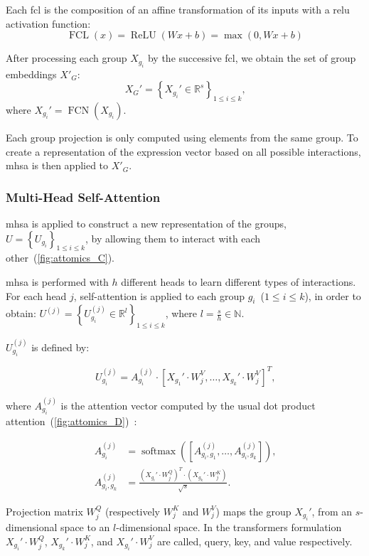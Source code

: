 \documentclass[../main.tex]{subfiles}
\begin{document}
Each \gls{fcl} is the composition of an affine transformation of its inputs with a \gls{relu} activation function:
\[ \operatorname{FCL}\left(x\right) = \operatorname{ReLU}\left(Wx+b \right) = \max\left(0, Wx+b\right) \]

After processing each group $X_{g_i}$ by the successive \gls{fcl}, we obtain the set of group embeddings $X'_G$:
\[ X_G' = \left\{ X_{g_i}' \in \mathbb{R}^{s}\right\}_{1 \leq i \leq k} \text{,} \]
where $X_{g_i}' = \operatorname{FCN}\left(X_{g_i}\right)$.

Each group projection is only computed using elements from the same group.
To create a representation of the expression vector based on all possible interactions, \gls{mhsa} is then applied to $X'_G$.

\subsubsection{Multi-Head Self-Attention}

\Gls{mhsa} is applied to construct a new representation of the groups, $U = \left\{ U_{g_i}\right\}_{1 \leq i \leq k}$, by allowing them to interact with each other~(\cref{fig:attomics_C}).

\Gls{mhsa} is performed with $h$ different heads to learn different types of interactions.
For each head $j$, self-attention is applied to each group $g_i$~($1 \leq i \leq k $), in order to obtain: $U^{(j)} = \left\{ U^{(j)}_{g_i} \in \mathbb{R}^{l} \right\}_{1 \leq i \leq k}$, where $l = \frac{s}{h} \in \mathbb{N}$.

$U^{(j)}_{g_i}$ is defined by:

\[ U^{(j)}_{g_i} = A^{(j)}_{g_i} \cdot \left[ X_{g_1}' \cdot W_j^V, \ldots ,  X_{g_k}' \cdot W_j^V\right]^T \text{,}\]

where $A^{(j)}_{g_i}$ is the attention vector computed by the usual dot product attention~(\cref{fig:attomics_D})~\cite{vaswaniAttentionAllYou2017}:

\begin{align*}
	A^{(j)}_{g_i}      & = \operatorname{softmax}\left(\left[A^{(j)}_{g_i,g_1}, \ldots,  A^{(j)}_{g_i,g_k}\right]\right) \text{,}  \\
	A^{(j)}_{g_i, g_k} & =  \frac{\left(X_{g_i}' \cdot W_j^Q\right)^T \cdot \left(X_{g_k}' \cdot W_j^K \right)}{\sqrt{s}} \text{.}
\end{align*}

Projection matrix $W^Q_j$ (respectively $W^K_j$ and $W^V_j$) maps the group $X_{g_i}'$, from an $s$-dimensional space to an $l$-dimensional space.
In the transformers formulation $X_{g_i}' \cdot W_j^Q$, $X_{g_k}' \cdot W^K_j$, and $X_{g_i}' \cdot W^V_j$ are called, query, key, and value respectively.
\end{document}
